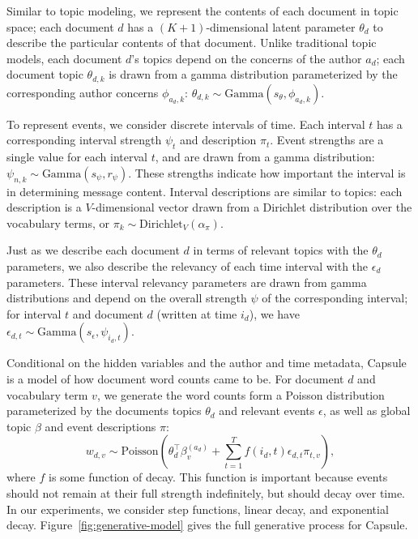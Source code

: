 Similar to topic modeling, we represent the contents of each document in topic space; each document $d$ has a $(K+1)$-dimensional latent parameter $\theta_d$ to describe the particular contents of that document.  Unlike traditional topic models, each document $d$'s topics depend on the concerns of the author $a_d$; each document topic $\theta_{d,k}$ is drawn from a gamma distribution parameterized by the corresponding author concerns $\phi_{a_d,k}$: $\theta_{d,k} \sim \mbox{Gamma}(s_\theta, \phi_{a_d,k})$.

To represent events, we consider discrete intervals of time.  Each interval $t$ has a corresponding interval strength $\psi_t$ and description $\pi_t$.  Event strengths are a single value for each interval $t$, and are drawn from a gamma distribution: $\psi_{n,k} \sim \mbox{Gamma}(s_\psi, r_\psi)$.  These strengths indicate how important the interval is in determining message content.  Interval descriptions are similar to topics: each description is a $V$-dimensional vector drawn from a Dirichlet distribution over the vocabulary terms, or $\pi_k \sim \mbox{Dirichlet}_V (\alpha_\pi).$

Just as we describe each document $d$ in terms of relevant topics with the $\theta_d$ parameters, we also describe the relevancy of each time interval with the $\epsilon_d$ parameters.  These interval relevancy parameters are drawn from gamma distributions and depend on the overall strength $\psi$ of the corresponding interval; for interval $t$ and document $d$ (written at time $i_d$), we have $\epsilon_{d,t} \sim \mbox{Gamma}(s_\epsilon, \psi_{i_d,t})$.

Conditional on the hidden variables and the author and time metadata, Capsule is a model of how document word counts came to be.  For document $d$ and vocabulary term $v$, we generate the word counts form a Poisson distribution parameterized by the documents topics $\theta_d$ and relevant events $\epsilon$, as well as global topic $\beta$ and event descriptions $\pi$:
\begin{equation}
w_{d,v} \sim \mbox{Poisson}\left(\theta_d^\top\beta^{(a_d)}_v + \sum_{t=1}^T f(i_d, t) \epsilon_{d,t} \pi_{t,v}\right),
\label{eq:generateData}
\end{equation}
where $f$ is some function of decay.  This function is important because events should not remain at their full strength indefinitely, but should decay over time.  In our experiments, we consider step functions, linear decay, and exponential decay.  Figure~\ref{fig:generative-model} gives the full generative process for Capsule.


